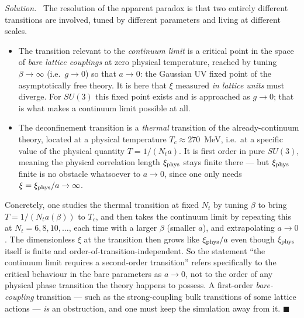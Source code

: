 \documentclass[11pt]{article}
\newenvironment{solution}{\par\smallskip\noindent\textit{Solution.}\ }{\hfill$\blacksquare$\par\smallskip}
\begin{document}
\begin{solution}
The resolution of the apparent paradox is that two entirely different transitions are involved, tuned by different parameters and living at different scales.
\begin{itemize}
  \item The transition relevant to the \emph{continuum limit} is a critical point in the space of \emph{bare lattice couplings} at zero physical temperature, reached by tuning $\beta \to \infty$ (i.e.\ $g\to0$) so that $a\to0$: the Gaussian UV fixed point of the asymptotically free theory. It is here that $\xi$ measured \emph{in lattice units} must diverge. For $SU(3)$ this fixed point exists and is approached as $g\to0$; that is what makes a continuum limit possible at all.
  \item The deconfinement transition is a \emph{thermal} transition of the already-continuum theory, located at a physical temperature $T_c \approx 270$~MeV, i.e.\ at a specific value of the physical quantity $T = 1/(N_t a)$. It is first order in pure $SU(3)$, meaning the physical correlation length $\xi_{\rm phys}$ stays finite there --- but $\xi_{\rm phys}$ finite is no obstacle whatsoever to $a \to 0$, since one only needs $\xi = \xi_{\rm phys}/a \to \infty$.
\end{itemize}
Concretely, one studies the thermal transition at fixed $N_t$ by tuning $\beta$ to bring $T = 1/(N_t a(\beta))$ to $T_c$, and then takes the continuum limit by repeating this at $N_t = 6, 8, 10, \dots$, each time with a larger $\beta$ (smaller $a$), and extrapolating $a\to0$. The dimensionless $\xi$ at the transition then grows like $\xi_{\rm phys}/a$ even though $\xi_{\rm phys}$ itself is finite and order-of-transition-independent. So the statement ``the continuum limit requires a second-order transition'' refers specifically to the critical behaviour in the bare parameters as $a\to0$, not to the order of any physical phase transition the theory happens to possess. A first-order \emph{bare-coupling} transition --- such as the strong-coupling bulk transitions of some lattice actions --- \emph{is} an obstruction, and one must keep the simulation away from it.
\end{solution}
\end{document}
